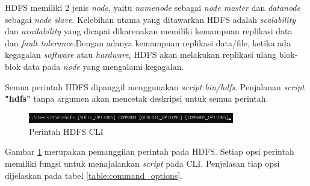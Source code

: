HDFS memiliki 2 jenis \textit{node}, yaitu \textit{namenode} sebagai \textit{node master} dan \textit{datanode} sebagai \textit{node slave}. Kelebihan utama yang ditawarkan HDFS adalah \textit{scalability} dan \textit{availability} yang dicapai dikarenakan memiliki kemampuan replikasi data dan \textit{fault tolerance}.Dengan adanya kemampuan replikasi data/file, ketika ada kegagalan \textit{software }atau \textit{hardware}, HDFS akan melakukan replikasi ulang blok-blok data pada \textit{node} yang mengalami kegagalan.

Semua perintah HDFS dipanggil menggunakan \textit{script} \textit{bin/hdfs}. Penjalanan \textit{script} \textbf{"hdfs"} tanpa argumen akan mencetak deskripsi untuk semua perintah.
\begin{figure}[H]
	\centering
	\includegraphics[width=0.8\textwidth]{Gambar/hdfs2.png}
	\caption{Perintah HDFS CLI}
	\label{fig:hdfs}
\end{figure}
Gambar \ref{fig:hdfs} merupakan pemanggilan perintah pada HDFS. Setiap opsi perintah memiliki fungsi untuk menajalankan \textit{script} pada CLI. Penjelasan tiap opsi dijelaskan pada tabel \ref{table:command_options}.  

\begin{table}[H]
	\caption{\label{table:command_options}\textit{Hadoop} memiliki opsi \textit{parsing framework} yang menjelaskan setiap fungsi kelasnya }
\end{table}

